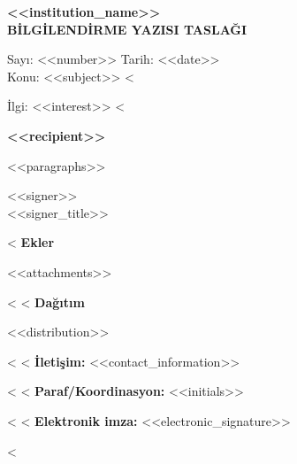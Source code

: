 \documentclass[11pt,a4paper]{article}
\begin{document}
\begin{center}{\bfseries <<institution_name>>\\}{\bfseries BİLGİLENDİRME YAZISI TASLAĞI}\end{center}
\noindent Sayı: <<number>> \hfill Tarih: <<date>>\\
\noindent Konu: <<subject>>
<%
\par\noindent İlgi: <<interest>>
<%
\vspace{8mm}
\begin{center}\bfseries <<recipient>>\end{center}
<<paragraphs>>
\vspace{10mm}
\begin{flushright}<<signer>>\\<<signer_title>>\end{flushright}
<%
\noindent\textbf{Ekler}
\begin{enumerate}[leftmargin=*]
<<attachments>>
\end{enumerate}
<%
<%
\noindent\textbf{Dağıtım}
\begin{itemize}[leftmargin=*]
<<distribution>>
\end{itemize}
<%
<%
\noindent\textbf{İletişim:} <<contact_information>>\par
<%
<%
\noindent\textbf{Paraf/Koordinasyon:} <<initials>>\par
<%
<%
\noindent\textbf{Elektronik imza:} <<electronic_signature>>\par
<%
\end{document}
